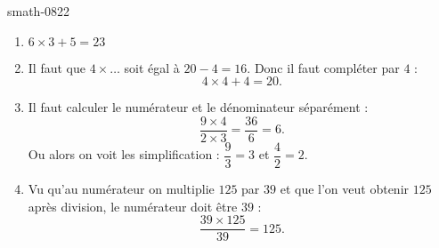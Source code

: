 
\begin{corrige}{smath-0822}

    \begin{enumerate}
        \item
            \( 6\times 3+5=23\)
        \item
            Il faut que \( 4\times \ldots\) soit égal à \( 20-4=16\). Donc il faut compléter par \( 4\) :
            \begin{equation}
                4\times 4+4=20.
            \end{equation}
        \item
            Il faut calculer le numérateur et le dénominateur séparément :
            \begin{equation}
                \frac{ 9\times 4 }{ 2\times 3 }=\frac{ 36 }{ 6 }=6.
            \end{equation}
            Ou alors on voit les simplification : \( \dfrac{ 9 }{ 3 }=3\) et \( \dfrac{ 4 }{ 2 }=2\).
        \item
            Vu qu'au numérateur on multiplie \( 125\) par \( 39\) et que l'on veut obtenir \( 125\) après division, le numérateur doit être \( 39 \) :
            \begin{equation}
                \frac{ 39\times 125 }{ 39 }=125.
            \end{equation}
    \end{enumerate}

\end{corrige}
